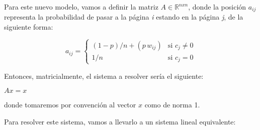 Para este nuevo modelo, vamos a definir la matriz $A \in \mathbb{R}^{nxn}$, donde la posición $a_{ij}$ representa la probabilidad de pasar a la página \textit{i} estando en la página \textit{j}, de la siguiente forma:

\[ a_{ij} =
	\begin{cases}
		(1-p)/n + (p \, w_{ij}) 	& \text{si } c_{j}  \neq 0 \\
		1/n 				& \text{si } c_{j}   =   0
	\end{cases}
\]

Entonces, matricialmente, el sistema a resolver sería el siguiente:

$Ax = x$

donde tomaremos por convención al vector $x$ como de norma 1.

Para resolver este sistema, vamos a llevarlo a un sistema lineal equivalente:

